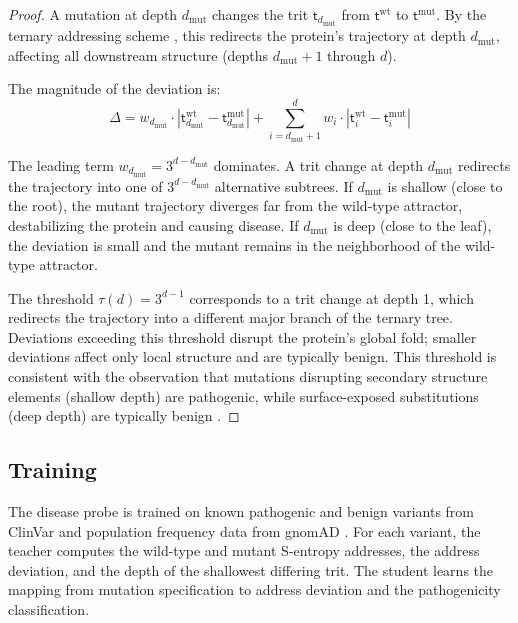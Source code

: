 \documentclass[11pt,twocolumn,a4paper]{article}
\theoremstyle{definition}
\theoremstyle{remark}
\newcommand{\trit}{\mathsf{t}}
\begin{document}
\begin{proof}
A mutation at depth $d_{\text{mut}}$ changes the trit $\trit_{d_{\text{mut}}}$ from $\trit^{\text{wt}}$ to $\trit^{\text{mut}}$. By the ternary addressing scheme \citep{sachikonye2025d}, this redirects the protein's trajectory at depth $d_{\text{mut}}$, affecting all downstream structure (depths $d_{\text{mut}}+1$ through $d$).

The magnitude of the deviation is:
\begin{equation}
\Delta = w_{d_{\text{mut}}} \cdot |\trit_{d_{\text{mut}}}^{\text{wt}} - \trit_{d_{\text{mut}}}^{\text{mut}}| + \sum_{i=d_{\text{mut}}+1}^{d} w_i \cdot |\trit_i^{\text{wt}} - \trit_i^{\text{mut}}|
\end{equation}

The leading term $w_{d_{\text{mut}}} = 3^{d - d_{\text{mut}}}$ dominates. A trit change at depth $d_{\text{mut}}$ redirects the trajectory into one of $3^{d - d_{\text{mut}}}$ alternative subtrees. If $d_{\text{mut}}$ is shallow (close to the root), the mutant trajectory diverges far from the wild-type attractor, destabilizing the protein and causing disease. If $d_{\text{mut}}$ is deep (close to the leaf), the deviation is small and the mutant remains in the neighborhood of the wild-type attractor.

The threshold $\tau(d) = 3^{d-1}$ corresponds to a trit change at depth 1, which redirects the trajectory into a different major branch of the ternary tree. Deviations exceeding this threshold disrupt the protein's global fold; smaller deviations affect only local structure and are typically benign. This threshold is consistent with the observation that mutations disrupting secondary structure elements (shallow depth) are pathogenic, while surface-exposed substitutions (deep depth) are typically benign \citep{sachikonye2025e}.
\end{proof}

\subsection{Training}

The disease probe is trained on known pathogenic and benign variants from ClinVar \citep{landrum2018} and population frequency data from gnomAD \citep{karczewski2020}. For each variant, the teacher computes the wild-type and mutant S-entropy addresses, the address deviation, and the depth of the shallowest differing trit. The student learns the mapping from mutation specification to address deviation and the pathogenicity classification.
\end{document}
